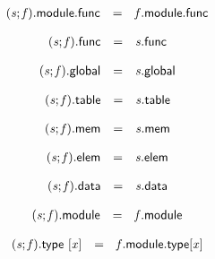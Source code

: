 $$
\begin{array}{@{}lcl@{}l@{}}
({\mathit{s}} ; {\mathit{f}}).\mathsf{module}.\mathsf{func} &=& {\mathit{f}}.\mathsf{module}.\mathsf{func} &  \\
\end{array}
$$

$$
\begin{array}{@{}lcl@{}l@{}}
({\mathit{s}} ; {\mathit{f}}).\mathsf{func} &=& {\mathit{s}}.\mathsf{func} &  \\
\end{array}
$$

$$
\begin{array}{@{}lcl@{}l@{}}
({\mathit{s}} ; {\mathit{f}}).\mathsf{global} &=& {\mathit{s}}.\mathsf{global} &  \\
\end{array}
$$

$$
\begin{array}{@{}lcl@{}l@{}}
({\mathit{s}} ; {\mathit{f}}).\mathsf{table} &=& {\mathit{s}}.\mathsf{table} &  \\
\end{array}
$$

$$
\begin{array}{@{}lcl@{}l@{}}
({\mathit{s}} ; {\mathit{f}}).\mathsf{mem} &=& {\mathit{s}}.\mathsf{mem} &  \\
\end{array}
$$

$$
\begin{array}{@{}lcl@{}l@{}}
({\mathit{s}} ; {\mathit{f}}).\mathsf{elem} &=& {\mathit{s}}.\mathsf{elem} &  \\
\end{array}
$$

$$
\begin{array}{@{}lcl@{}l@{}}
({\mathit{s}} ; {\mathit{f}}).\mathsf{data} &=& {\mathit{s}}.\mathsf{data} &  \\
\end{array}
$$

$$
\begin{array}{@{}lcl@{}l@{}}
({\mathit{s}} ; {\mathit{f}}).\mathsf{module} &=& {\mathit{f}}.\mathsf{module} &  \\
\end{array}
$$

$$
\begin{array}{@{}lcl@{}l@{}}
({\mathit{s}} ; {\mathit{f}}).\mathsf{type}~{}[{\mathit{x}}] &=& {\mathit{f}}.\mathsf{module}.\mathsf{type}{}[{\mathit{x}}] &  \\
\end{array}
$$

